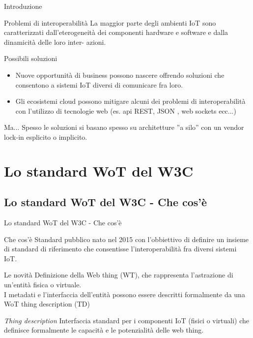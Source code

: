 \documentclass{beamer}
\begin{document}
	\begin{frame}{Introduzione}
	\begin{alertblock}{Problemi di interoperabilità}
		La maggior parte degli ambienti IoT sono
		caratterizzati dall’eterogeneità dei componenti hardware e software e dalla dinamicità delle loro inter-
		azioni.
	\end{alertblock}
	\begin{exampleblock}{Possibili soluzioni}
		\begin{itemize}
			\item Nuove opportunità di business possono nascere offrendo soluzioni che consentono a
			sistemi IoT diversi di comunicare fra loro.
			\item Gli ecosistemi cloud possono mitigare alcuni dei
			problemi di interoperabilità con l’utilizzo di tecnologie web (es. api REST, JSON , web sockets ecc...)
		\end{itemize}
	\end{exampleblock}
	\begin{alertblock}{Ma...}
		Spesso le soluzioni si basano spesso su architetture ”a silo” con un vendor lock-in esplicito o implicito.
	\end{alertblock}
	\end{frame}

	\section{Lo standard WoT del W3C}
	\subsection{Lo standard WoT del W3C - Che cos'è}
	\begin{frame}{Lo standard WoT del W3C - Che cos'è}
	\begin{exampleblock}{Che cos'è}
		Standard pubblico nato nel 2015 con l’obbiettivo di definire un insieme di
		standard di riferimento che consentisse l’interoperabilità fra diversi sistemi IoT.
	\end{exampleblock}
	\begin{exampleblock}{Le novità}
		Definizione della Web thing (WT), che rappresenta l’astrazione di un’entità
		fisica o virtuale.  \\
		I metadati e l’interfaccia dell'entità possono essere descritti formalmente da una WoT thing
		description (TD)
	\end{exampleblock}
	\begin{block}{\textit{Thing description}}
		Interfaccia standard per i
		componenti IoT (fisici o virtuali) che definisce formalmente le capacità
		e le potenzialità delle web thing.
	\end{block}
	\end{frame}
\end{document}
